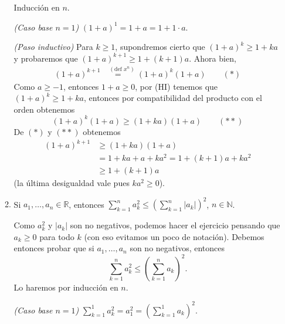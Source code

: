 \begin{enumerate}
\begin{enumerate}
        \rta Inducción en $n$.
        
        \textit{(Caso base $n=1$)} $(1+a)^1 = 1+a = 1+ 1\cdot a$. 
        
        \textit{(Paso inductivo)}  Para  $k \ge 1$,  supondremos cierto que $(1+a)^k\geq 1+k a$ y probaremos  que $(1+a)^{k+1}\geq 1+(k+1) a$. Ahora bien, 
        \begin{align*}
        (1+a)^{k+1} &\overset{(\text{def } x^n)}{=\quad} (1+a)^k(1+a) \qquad (*)
        \end{align*}
        Como $a\ge -1$, entonces $1+a \ge 0$, por (HI) tenemos  que $(1+a)^k\geq 1+k a$, entonces  por compatibilidad del  producto con el orden obtenemos
        \begin{equation*}
            (1+a)^k(1+a) \ge   (1+k a)(1+a)  \qquad (**)
        \end{equation*}
        De $(*)$ y $(**)$ obtenemos
        \begin{align*}
        (1+a)^{k+1} &\ge (1+k a)(1+a) \\
        &= 1+ ka + a + ka^2 = 1 + (k+1)a + ka^2 \\
        &\ge 1 + (k+1)a
        \end{align*}
        (la última desigualdad vale pues $ka^2 \ge 0$). 
        
        
        \item Si $a_1,\dots,a_n \in \mathbb R$, entonces $\displaystyle{\sum_{k=1}^n a_{k}^{2}\leq \left(\sum_{k=1}^n |a_{k}|\right)^{2}}$, $n\in \mathbb N$.
        
        \rta Como $a_k^2$ y $|a_k|$ son no negativos, podemos hacer el ejercicio pensando que $a_k \ge 0$ para todo $k$ (con eso evitamos un poco de notación). Debemos entonces probar que  si $a_1,\dots,a_n $ son no negativos, entonces
        \begin{equation*}
            \sum_{k=1}^n a_{k}^{2}\leq \left(\sum_{k=1}^n a_{k}\right)^{2}. 
        \end{equation*} 
        Lo haremos por inducción en $n$.
         
        \textit{(Caso base $n=1$)} $\sum_{k=1}^1 a_{k}^{2} = a_1^2 = (\sum_{k=1}^1 a_{k})^{2}$.
        

\end{enumerate}
\end{enumerate}

